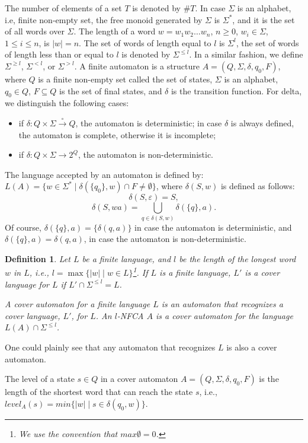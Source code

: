 \documentclass[submission,copyright,creativecommons]{eptcs}
\newtheorem{definition}{Definition}
\begin{document}
The number of elements of a set $T$ is denoted by $\#T$. 
In case $\Sigma$ is an alphabet, i.e, finite non-empty set, the free monoid generated 
by $\Sigma$ is $\Sigma^*$, and it is the set of all words over $\Sigma$.
The length of a word $w=w_1w_2\ldots w_n$, $n\geq 0$, $w_i\in \Sigma$, 
$1\leq i\leq n$, is $|w|=n$.
The set of words of length equal to $l$ is $\Sigma^l$, the set of words of length less than or equal 
to $l$ is denoted by $\Sigma^{\leq l}$. 
In a similar fashion, we define $\Sigma^{\geq l}$, $\Sigma^{< l}$, or $\Sigma^{> l}$.
A finite automaton is a structure  $A=(Q,\Sigma,\delta,q_0,F)$, where
$Q$ is a finite non-empty set called the set of states, $\Sigma$ is an alphabet, $q_0\in Q$,  
$F\subseteq Q$ is the set of final states, and $\delta$ is the transition function.
For delta, we distinguish the following cases:
\begin{itemize}
 \item if $\delta:Q\times\Sigma\stackrel{\circ}{\longrightarrow} Q$, the automaton is deterministic; 
in case $\delta$ is always defined, the automaton is complete, otherwise it is incomplete;
 \item if $\delta:Q\times\Sigma\longrightarrow 2^Q$, the automaton is non-deterministic.
\end{itemize}
The language accepted by an automaton is defined by:
$L(A)=\{w\in \Sigma^*\mid \delta(\{q_0\},w)\cap F\neq \emptyset\}$, where
$\delta(S,w)$ is defined as follows:
$$\delta(S,\varepsilon)=S,$$
$$\delta(S,wa)=\displaystyle\bigcup_{q\in \delta(S,w)}\delta(\{q\},a).$$
Of course, $\delta(\{q\},a)=\{\delta(q,a)\}$ in case the automaton is deterministic, and 
$\delta(\{q\},a)=\delta(q,a)$, in case the automaton is non-deterministic.
\begin{definition}
Let $L$ be a finite language, and $l$ be the length of the longest word $w$ in $L$, i.e.,
$l=\max\{|w| \mid w\in L\}$\footnote{ We use the convention that $max\emptyset=0$.}.
If $L$ is a finite language, $L'$ is a cover language for $L$ if $L'\cap \Sigma^{\leq l}=L$.

A cover automaton for a finite language $L$ is an automaton that
recognizes a cover language, $L'$, for $L$.
An $l$-NFCA $A$ is a cover automaton for the language $L(A)\cap \Sigma^{\leq l}$.
\end{definition}

One could plainly see  that any automaton that recognizes $L$ is also a cover automaton.

The level of a state $s\in Q$ in a cover automaton $A=(Q,\Sigma,\delta,q_0,F)$ is
the length of the shortest word that can reach the state $s$, i.e., 
$level_A(s)=min\{|w|\mid s\in\delta(q_0,w)\}$.
\end{document}
